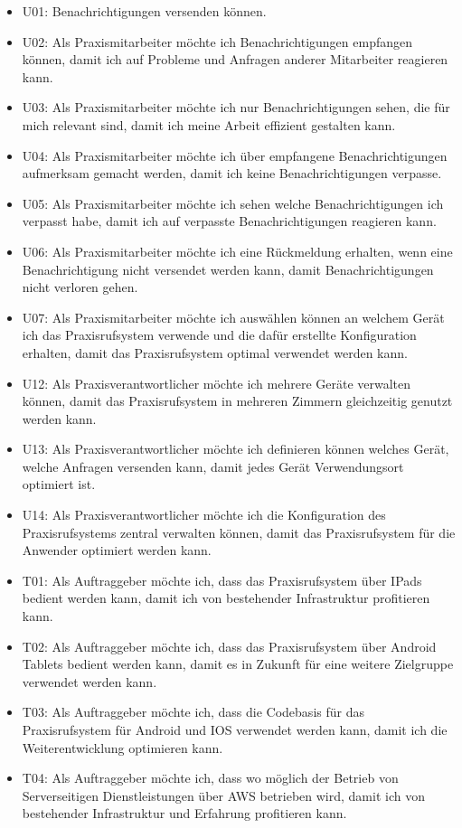 \begin{itemize}
    \item U01: Benachrichtigungen versenden können.
    \item U02: Als Praxismitarbeiter möchte ich Benachrichtigungen empfangen können, damit ich auf Probleme und Anfragen anderer Mitarbeiter reagieren kann.
    \item U03: Als Praxismitarbeiter möchte ich nur Benachrichtigungen sehen, die für mich relevant sind, damit ich meine Arbeit effizient gestalten kann.
    \item U04: Als Praxismitarbeiter möchte ich über empfangene Benachrichtigungen aufmerksam gemacht werden, damit ich keine Benachrichtigungen verpasse.
    \item U05: Als Praxismitarbeiter möchte ich sehen welche Benachrichtigungen ich verpasst habe, damit ich auf verpasste Benachrichtigungen reagieren kann.
    \item U06: Als Praxismitarbeiter möchte ich eine Rückmeldung erhalten, wenn eine Benachrichtigung nicht versendet werden kann, damit Benachrichtigungen nicht verloren gehen.
    \item U07: Als Praxismitarbeiter möchte ich auswählen können an welchem Gerät ich das Praxisrufsystem verwende und die dafür erstellte Konfiguration erhalten, damit das Praxisrufsystem optimal verwendet werden kann.
    \item U12: Als Praxisverantwortlicher möchte ich mehrere Geräte verwalten können, damit das Praxisrufsystem in mehreren Zimmern gleichzeitig genutzt werden kann.
    \item U13: Als Praxisverantwortlicher möchte ich definieren können welches Gerät, welche Anfragen versenden kann, damit jedes Gerät Verwendungsort optimiert ist.
    \item U14: Als Praxisverantwortlicher möchte ich die Konfiguration des Praxisrufsystems zentral verwalten können, damit das Praxisrufsystem für die Anwender optimiert werden kann.
    \item T01: Als Auftraggeber möchte ich, dass das Praxisrufsystem über IPads bedient werden kann, damit ich von bestehender Infrastruktur profitieren kann.
    \item T02: Als Auftraggeber möchte ich, dass das Praxisrufsystem über Android Tablets bedient werden kann, damit es in Zukunft für eine weitere Zielgruppe verwendet werden kann.
    \item T03: Als Auftraggeber möchte ich, dass die Codebasis für das Praxisrufsystem für Android und IOS verwendet werden kann, damit ich die Weiterentwicklung optimieren kann.
    \item T04: Als Auftraggeber möchte ich, dass wo möglich der Betrieb von Serverseitigen Dienstleistungen über AWS betrieben wird, damit ich von bestehender Infrastruktur und Erfahrung profitieren kann.
\end{itemize}

